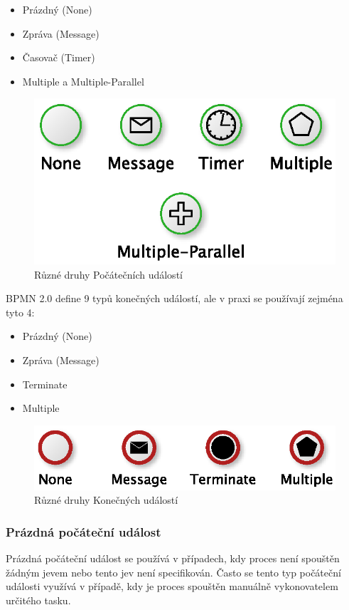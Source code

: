 \documentclass[]{article}
\begin{document}
\begin{itemize}
\item Prázdný (None)
\item Zpráva (Message)
\item Časovač (Timer)
\item Multiple a Multiple-Parallel
\end{itemize}

\begin{figure}[H]\centering
\includegraphics{obrazky/start-events}
\caption{Různé druhy Počátečních událostí}
\label{fig:pocatecni_udalosti}
\end{figure}

BPMN 2.0 define 9 typů konečných událostí, ale v praxi se používají zejména tyto 4: \cite{Silver2011}

\begin{itemize}
\item Prázdný (None)
\item Zpráva (Message)
\item Terminate
\item Multiple
\end{itemize}

\begin{figure}[H]\centering
\includegraphics{obrazky/end-events}
\caption{Různé druhy Konečných událostí}
\label{fig:konecne_udalosti}
\end{figure}

\subsubsection{Prázdná počáteční událost}
Prázdná počáteční událost se používá v případech, kdy proces není spouštěn žádným jevem nebo tento jev není specifikován. Často se tento typ počáteční události využívá v případě, kdy je proces spouštěn manuálně vykonovatelem určitého tasku.
\end{document}
